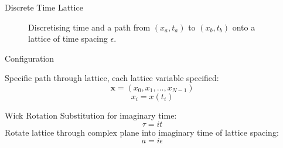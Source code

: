 \documentclass{beamer}
\begin{document}
\begin{frame}{Discrete Time Lattice}
{\begin{figure}
            \vspace*{-2mm}\caption{ Discretising time and a path from $\left(x_a,t_a\right)$ to $\left(x_b,t_b\right)$  onto a lattice of time spacing $\epsilon$.}
            \label{fig:TimeLattice}
        \end{figure}
        }
        
        {
            \begin{block}{Configuration}
            {
                Specific path through lattice, each lattice variable specified:
                \begin{equation*}
                    \label{eq:Configuration}
                        \bm{x} = \left(x_0,x_1,\dots,x_{N-1}\right)
                \end{equation*}
                \begin{equation*}
                    \label{eq:SiteNotation}
                        x_i=x\left(t_i\right)
                \end{equation*}
                
            }
            \end{block}
        {
            \begin{block}{Wick Rotation}
                {
                    Substitution for imaginary time:
                    \begin{equation*}
                    \label{eq:WickRotation}
                        \tau = it 
                    \end{equation*}
                }
                {   Rotate lattice through complex plane into imaginary time of lattice spacing:
                    \begin{equation*}
                        \label{eq:WickRotationLattice}
                        a = i \epsilon
                    \end{equation*}
                }
            

\end{block}}}
\end{frame}
\end{document}
